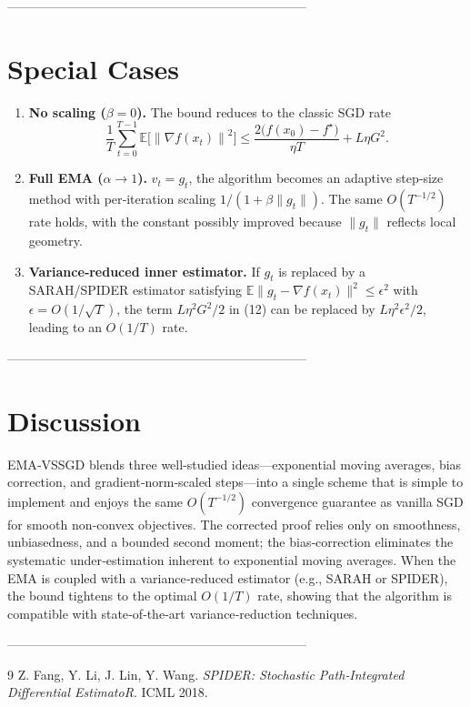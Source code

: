 \documentclass{article}
\newcommand{\E}{\mathbb{E}}
\newcommand{\norm}[1]{\left\|#1\right\|}
\newcommand{\grad}{\nabla}
\begin{document}
-----------------------------------------------------------------------

\section*{Special Cases}
\begin{enumerate}[label=(\alph*)]
    \item \textbf{No scaling ($\beta=0$).}  
    The bound reduces to the classic SGD rate
    \[
    \frac{1}{T}\sum_{t=0}^{T-1}\E\!\bigl[\norm{\grad f(x_{t})}^{2}\bigr]
    \le \frac{2\bigl(f(x_{0})-f^{\star}\bigr)}{\eta T}+L\eta G^{2}.
    \]
    \item \textbf{Full EMA ($\alpha\to1$).}  
    $\hat v_{t}=g_{t}$, the algorithm becomes an adaptive step‑size method with per‑iteration scaling $1/(1+\beta\|g_{t}\|)$. The same $O(T^{-1/2})$ rate holds, with the constant possibly improved because $\|g_{t}\|$ reflects local geometry.
    \item \textbf{Variance‑reduced inner estimator.}  
    If $g_{t}$ is replaced by a SARAH/SPIDER estimator satisfying $\E\|g_{t}-\grad f(x_{t})\|^{2}\le\epsilon^{2}$ with $\epsilon=O(1/\sqrt{T})$, the term $L\eta^{2}G^{2}/2$ in (12) can be replaced by $L\eta^{2}\epsilon^{2}/2$, leading to an $O(1/T)$ rate.
\end{enumerate}

-----------------------------------------------------------------------

\section*{Discussion}
EMA‑VSSGD blends three well‑studied ideas—exponential moving averages, bias correction, and gradient‑norm‑scaled steps—into a single scheme that is simple to implement and enjoys the same $O(T^{-1/2})$ convergence guarantee as vanilla SGD for smooth non‑convex objectives. The corrected proof relies only on smoothness, unbiasedness, and a bounded second moment; the bias‑correction eliminates the systematic under‑estimation inherent to exponential moving averages. When the EMA is coupled with a variance‑reduced estimator (e.g., SARAH or SPIDER), the bound tightens to the optimal $O(1/T)$ rate, showing that the algorithm is compatible with state‑of‑the‑art variance‑reduction techniques.

-----------------------------------------------------------------------

\begin{thebibliography}{9}
Z. Fang, Y. Li, J. Lin, Y. Wang. \textit{SPIDER: Stochastic Path‑Integrated Differential EstimatoR}. ICML 2018.
\end{thebibliography}
\end{document}
